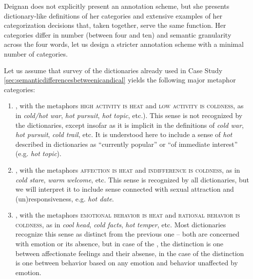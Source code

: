 Deignan does not explicitly present an annotation  scheme, but she presents dictionary\hyp{}like  definitions of her categories and extensive examples of her categorization  decisions that, taken together, serve the same function. Her categories differ in number (between four and ten) and semantic  granularity across the four words, let us design  a stricter annotation  scheme with a minimal number of  categories.

Let us assume that survey of the dictionaries  already used in Case Study \ref{sec:semanticdifferencesbetweenicandical} yields the following major metaphor  categories:

\begin{enumerate}

\item {}, with the metaphors \textsc{high activity is heat} and \textsc{low activity is coldness}, as in \textit{cold\slash hot war}, \textit{hot pursuit}, \textit{hot topic}, etc.). This sense is not recognized by the dictionaries,  except insofar as it is implicit in the definitions of \textit{cold war}, \textit{hot pursuit}, \textit{cold trail}, etc. It is understood here to include a sense of \textit{hot} described in dictionaries as ``currently popular'' or ``of immediate interest'' (e.g. \textit{hot topic}).

\item {}, with the metaphors  \textsc{affection is heat} and \textsc{indifference is coldness}, as in \textit{cold stare}, \textit{warm welcome}, etc. This sense is recognized by all dictionaries,  but we will interpret it to include sense connected with sexual attraction and (un)responsiveness, e.g. \textit{hot date}.

\item {}, with the metaphors  \textsc{emotional behavior is heat} and \textsc{rational behavior is coldness}, as in \textit{cool head}, \textit{cold facts}, \textit{hot temper}, etc. Most dictionaries  recognize this sense as distinct from the previous one -- both are concerned with emotion  or its absence, but in case of the , the distinction is one between affectionate feelings and their absense, in the case of  the distinction is one between behavior based on any emotion  and behavior unaffected by emotion.


\end{enumerate}
